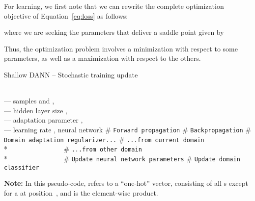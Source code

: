 \documentclass[twoside,11pt]{article}
\begin{document}
For learning, we first note that we can rewrite the complete optimization objective of Equation~\eqref{eq:loss} as follows:

where we are seeking the parameters  that deliver a saddle point given by

Thus, the optimization problem involves a minimization with respect to some parameters, as well as a maximization with respect to the others. 



\begin{algorithm}[t] \footnotesize
   \caption{Shallow DANN -- Stochastic training update}
   \label{alg:stoch-up}
\begin{multicols}{2}
\begin{algorithmic}[1]
    \\
   --- samples  and ,\\
   --- hidden layer size , \\
   --- adaptation parameter ,\\
   --- learning rate ,
    neural network  
   \vspace{2mm}
\STATE 
   \STATE 
   \STATE \# {\tt Forward propagation}
   \STATE 
   \STATE 
   \vspace{1.5mm}
   \STATE \# {\tt Backpropagation}
   \STATE  
\STATE  
   \STATE 
\STATE 
   \vspace{1.5mm}
   \STATE \# {\tt Domain adaptation regularizer...}
   \STATE \# {\tt ...from current domain}
   \STATE 
   \STATE  
   \STATE 
   \STATE \\*
   ~~~~~~~~~~~~~~~
   \STATE  
   \STATE 
   \label{algoline:omit1}
      \vspace{1.5mm}
   \STATE \# {\tt ...from other domain}
   \STATE 
   \STATE 
   \STATE  
   \STATE 
   \STATE 
   \STATE \\*
   ~~~~~~~~~~~~~~~
   \STATE  
   \STATE 
   \label{algoline:omit2}
      \vspace{1.5mm}
   \STATE \# {\tt Update neural network parameters}
   \STATE  
   \STATE 
   \STATE  
   \STATE 
      \vspace{1.5mm}
   \STATE \# {\tt Update domain classifier}
\STATE  
   \STATE 
   \label{algoline:da}
      \ENDFOR
   \ENDWHILE
\end{algorithmic}
\end{multicols}
{\bf Note:} In this pseudo-code,  refers to a ``one-hot'' vector, consisting of all s except for a  at position~, and  is the element-wise product.
\end{algorithm}
\end{document}
